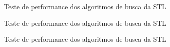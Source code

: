 \begin{frame}[fragile]{Teste de performance dos algoritmos de busca da STL}
\end{frame}

\begin{frame}[fragile]{Teste de performance dos algoritmos de busca da STL}
\end{frame}

\begin{frame}[fragile]{Teste de performance dos algoritmos de busca da STL}
\end{frame}

